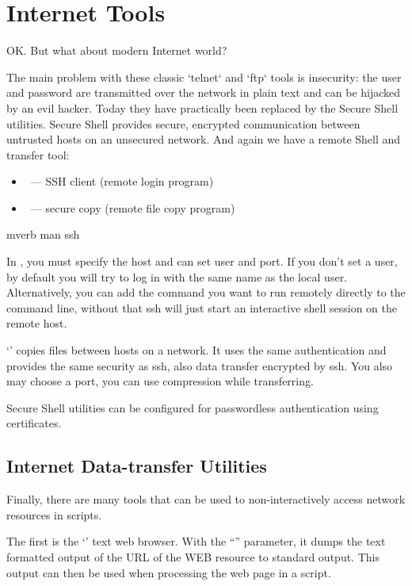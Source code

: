 \section*{Internet Tools}

OK. But what about modern Internet world?

The main problem with these classic `telnet` and `ftp` tools is insecurity: the user and password are transmitted over the network in plain text and can be hijacked by an evil hacker. Today they have practically been replaced by the Secure Shell utilities. Secure Shell provides secure, encrypted communication between untrusted hosts on an unsecured network. And again we have a remote Shell and transfer tool:
\begin{itemize}
\item {}~--- SSH client (remote login program)
\item {}~--- secure copy (remote file copy program)
\end{itemize}

\begin{code}{mverb}
man ssh
\end{code}
In , you must specify the host and can set user and port. If you don't
set a user, by default you will try to log in with the same name as the local
user. Alternatively, you can add the command you want to run remotely directly
to the command line, without that ssh will just start an interactive shell
session on the remote host.

`' copies files between hosts on a network.  It uses the same
authentication and provides the same security as ssh, also data transfer
encrypted by ssh. You also may choose a port, you can use compression
while transferring.

Secure Shell utilities can be configured for passwordless authentication
using certificates.

\subsection*{Internet Data-transfer Utilities} %

Finally, there are many tools that can be used to non-interactively
access network resources in scripts.

The first is the `' text web browser. With the ``''
parameter, it dumps the text formatted output of the URL of the WEB resource
to standard output. This output can then be used when processing the web page
in a script.

